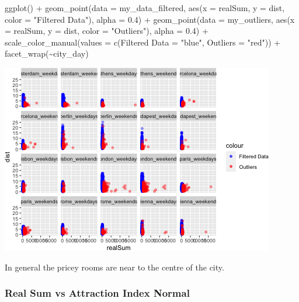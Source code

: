 \documentclass[
]{article}
\newenvironment{Shaded}{\begin{snugshade}}{\end{snugshade}}
\newcommand{\AttributeTok}[1]{\textcolor[rgb]{0.77,0.63,0.00}{#1}}
\newcommand{\FloatTok}[1]{\textcolor[rgb]{0.00,0.00,0.81}{#1}}
\newcommand{\FunctionTok}[1]{\textcolor[rgb]{0.00,0.00,0.00}{#1}}
\newcommand{\NormalTok}[1]{#1}
\newcommand{\OtherTok}[1]{\textcolor[rgb]{0.56,0.35,0.01}{#1}}
\newcommand{\SpecialCharTok}[1]{\textcolor[rgb]{0.00,0.00,0.00}{#1}}
\newcommand{\StringTok}[1]{\textcolor[rgb]{0.31,0.60,0.02}{#1}}
\begin{document}
\begin{Shaded}
\begin{Highlighting}[]
\FunctionTok{ggplot}\NormalTok{() }\SpecialCharTok{+} \FunctionTok{geom\_point}\NormalTok{(}\AttributeTok{data =}\NormalTok{ my\_data\_filtered, }\FunctionTok{aes}\NormalTok{(}\AttributeTok{x =}\NormalTok{ realSum,}
    \AttributeTok{y =}\NormalTok{ dist, }\AttributeTok{color =} \StringTok{"Filtered Data"}\NormalTok{), }\AttributeTok{alpha =} \FloatTok{0.4}\NormalTok{) }\SpecialCharTok{+} \FunctionTok{geom\_point}\NormalTok{(}\AttributeTok{data =}\NormalTok{ my\_outliers,}
    \FunctionTok{aes}\NormalTok{(}\AttributeTok{x =}\NormalTok{ realSum, }\AttributeTok{y =}\NormalTok{ dist, }\AttributeTok{color =} \StringTok{"Outliers"}\NormalTok{), }\AttributeTok{alpha =} \FloatTok{0.4}\NormalTok{) }\SpecialCharTok{+}
    \FunctionTok{scale\_color\_manual}\NormalTok{(}\AttributeTok{values =} \FunctionTok{c}\NormalTok{(}\StringTok{\textasciigrave{}}\AttributeTok{Filtered Data}\StringTok{\textasciigrave{}} \OtherTok{=} \StringTok{"blue"}\NormalTok{, }\AttributeTok{Outliers =} \StringTok{"red"}\NormalTok{)) }\SpecialCharTok{+}
    \FunctionTok{facet\_wrap}\NormalTok{(}\SpecialCharTok{\textasciitilde{}}\NormalTok{city\_day)}
\end{Highlighting}
\end{Shaded}

\includegraphics{Project_files/figure-latex/unnamed-chunk-15-2.png}

In general the pricey rooms are near to the centre of the city.

\hypertarget{real-sum-vs-attraction-index-normal}{%
\subsubsection{Real Sum vs Attraction Index
Normal}\label{real-sum-vs-attraction-index-normal}}
\end{document}
